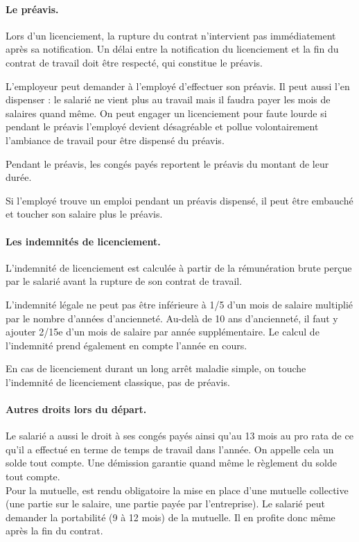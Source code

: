 \paragraph{Le préavis.}
Lors d'un licenciement, la rupture du contrat n'intervient pas immédiatement après sa notification.
Un délai entre la notification du licenciement et la fin du contrat de travail doit être respecté, qui constitue le préavis.

L’employeur peut demander à l’employé d’effectuer son préavis.
Il peut aussi l’en dispenser : le salarié ne vient plus au travail mais il faudra payer les mois de salaires quand même.
On peut engager un licenciement pour faute lourde si pendant le préavis l’employé devient désagréable et pollue volontairement l’ambiance de travail pour être dispensé du préavis.

Pendant le préavis, les congés payés reportent le préavis du montant de leur durée.

Si l’employé trouve un emploi pendant un préavis dispensé, il peut être embauché et toucher son salaire plus le préavis.


\paragraph{Les indemnités de licenciement.}
L'indemnité de licenciement est calculée à partir de la rémunération brute perçue par le salarié avant la rupture de son contrat de travail.

L'indemnité légale ne peut pas être inférieure à 1/5 d'un mois de salaire multiplié par le nombre d'années d'ancienneté. Au-delà de 10 ans d'ancienneté, il faut y ajouter 2/15e d'un mois de salaire par année supplémentaire. Le calcul de l'indemnité prend également en compte l'année en cours.

En cas de licenciement durant un long arrêt maladie simple, on touche l’indemnité de licenciement classique, pas de préavis.


\paragraph{Autres droits lors du départ.}
Le salarié a aussi le droit à ses congés payés ainsi qu'au 13 mois au pro rata de ce qu’il a effectué en terme de temps de travail dans l’année.
On appelle cela un solde tout compte.
Une démission garantie quand même le règlement du solde tout compte.\\

Pour la mutuelle, est rendu obligatoire la mise en place d’une mutuelle collective (une partie sur le salaire, une partie payée par l’entreprise).
Le salarié peut demander la portabilité (9 à 12 mois) de la mutuelle.
Il en profite donc même après la fin du contrat.\\

